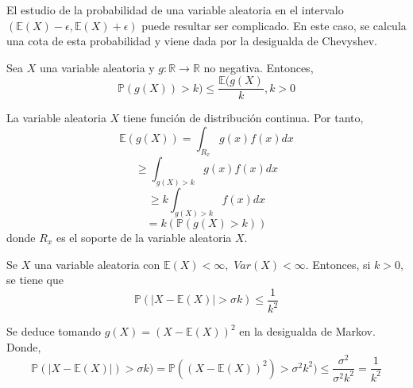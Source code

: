 \begin{nota2}
El estudio de la probabilidad de una variable aleatoria en el intervalo $(\mathbb{E}(X) - \epsilon, \mathbb{E}(X) + \epsilon)$ puede resultar ser complicado. En este caso, se calcula una cota de esta probabilidad y viene dada por la desigualda de Chevyshev.
\end{nota2}

\begin{theo}
Sea $X$ una variable aleatoria y $g:\mathbb{R}\rightarrow\mathbb{R}$ no negativa. Entonces, \[ \mathbb{P}(g(X))>k) \leq \frac{\mathbb{E}(g(X)}{k}, k>0 \]
\end{theo}

\begin{dem}
La variable aleatoria $X$ tiene función de distribución continua. Por tanto, \[ \mathbb{E}(g(X)) = \int_{R_x} g(x)f(x)dx \] \[ \geq \int_{g(X) > k} g(x)f(x)dx \] \[ \geq k \int_{g(X) > k} f(x)dx \] \[ = k(\mathbb{P}(g(X)>k)) \] donde $R_x$ es el soporte de la variable aleatoria $X$.
\end{dem}

\begin{theo}
Se $X$ una variable aleatoria con $\mathbb{E}(X) < \infty,$ $Var(X)<\infty$. Entonces, si $ k>0,$ se tiene que \[ \mathbb{P}(|X-\mathbb{E}(X)| > \sigma k) \leq \frac{1}{k^2} \]
\end{theo}

\begin{dem}
Se deduce tomando $g(X) = (X-\mathbb{E}(X))^2$ en la desigualda de Markov. Donde, \[ \mathbb{P}(|X-\mathbb{E}(X)|)> \sigma k) = \mathbb{P}((X-\mathbb{E}(X))^2)> \sigma^2 k^2) \leq \frac{\sigma^2}{\sigma^2 k^2} = \frac{1}{k^2} \] 
\end{dem}

\begin{ejr}

\end{ejr}

\begin{ejr}

\end{ejr}


\begin{ejr}[2.38 , Schaum]

\end{ejr}

\begin{ejr}[2.39 , Schaum]

\end{ejr}

